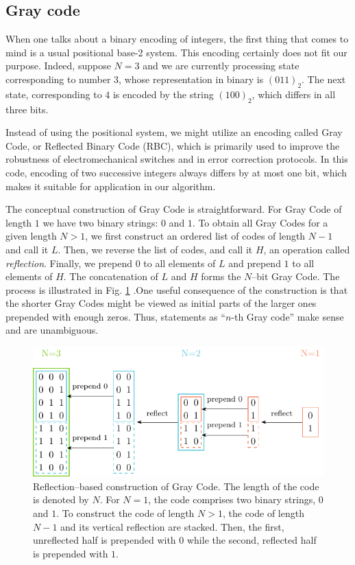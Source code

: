 \subsection{Gray code}
When one talks about a binary encoding of integers, the first thing that comes to mind is a usual positional base-2 system. This encoding certainly does not fit our purpose.
Indeed, suppose $N=3$ and we are currently processing state corresponding to number $3$, whose representation in binary is $(011)_{2}$. The next state, corresponding to $4$ is encoded by the string $(100)_{2}$, which differs in all three bits.

Instead of using the positional system, we might utilize an encoding called Gray Code, or Reflected Binary Code (RBC), which is primarily used to improve the robustness of electromechanical switches and in error correction protocols. In this code, encoding of two successive integers always differs by at most one bit, which makes it suitable for application in our algorithm.

The conceptual construction of Gray Code is straightforward. For Gray Code of length $1$ we have two binary strings: $0$ and $1$. To obtain all Gray Codes for a given length $N > 1$, we first construct an ordered list of codes of length $N-1$ and call it $L$. Then, we reverse the list of codes, and call it $H$, an operation called \emph{reflection}. Finally, we prepend $0$ to all elements of $L$ and prepend $1$ to all elements of $H$. The concatenation of $L$ and $H$ forms the $N$--bit Gray Code. The process is illustrated in Fig. \ref{fig:gray} .One useful consequence of the construction is that the shorter Gray Codes might
be viewed as initial parts of the larger ones prepended with enough zeros. Thus,
statements as ``$n$-th Gray code'' make sense and are unambiguous.

\begin{figure}
  \includegraphics[width=\textwidth]{figures/gray.pdf}
  \caption{Reflection--based construction of Gray Code. The length of the code is denoted by $N$. For $N=1$, the code comprises two binary strings, $0$ and $1$. To construct the code of length $N>1$, the code of length $N-1$ and its vertical reflection are stacked. Then, the first, unreflected half is prepended with $0$ while the second, reflected half is prepended with $1$.}
  \label{fig:gray}
\end{figure}


